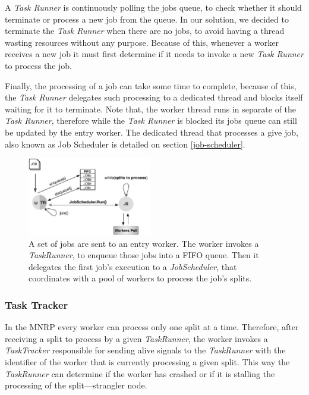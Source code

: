 \documentclass[times, 10pt,twocolumn]{article}
\begin{document}
            A \emph{Task Runner} is continuously polling the jobs queue, to check whether it should terminate or process a new job from the queue. In our solution, we decided to terminate the \emph{Task Runner} when there are no jobs, to avoid having a thread wasting resources without any purpose. Because of this, whenever a worker receives a new job it must first determine if it needs to invoke a new \emph{Task Runner} to process the job.
            
            Finally, the processing of a job can take some time to complete, because of this, the \emph{Task Runner} delegates such processing to a dedicated thread and blocks itself waiting for it to terminate. Note that, the worker thread runs in separate of the \emph{Task Runner}, therefore while the \emph{Task Runner} is blocked its jobs queue can still be updated by the entry worker. The dedicated thread that processes a give job, also known as Job Scheduler is detailed on section \ref{job-scheduler}.

            \begin{figure}[h]
                \begin{center}
                    \includegraphics[width=0.48\textwidth]{pics/taskrunner-example.pdf}
                    \caption{A set of jobs are sent to an entry worker. The worker invokes a \textit{TaskRunner}, to enqueue those jobs into a FIFO queue. Then it delegates the first job's execution to a \textit{JobScheduler}, that coordinates with a pool of workers to process the job's splits.}
                    \label{fig:mnr-taskrunner-example}
                \end{center}
            \end{figure}

            \subsubsection{Task Tracker}
            
           In the \ac{MNRP} every worker can process only one split at a time. Therefore, after receiving a split to process by a given \textit{TaskRunner}, the worker invokes a \textit{TaskTracker} responsible for sending alive signals to the \textit{TaskRunner} with the identifier of the worker that is currently processing a given split. This way the \textit{TaskRunner} can determine if the worker has crashed or if it is stalling the processing of the split—strangler node.
\end{document}
